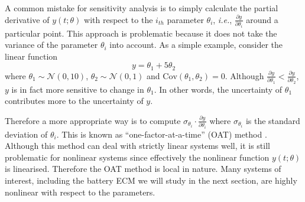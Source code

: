 \documentclass[letterpaper,twocolumn]{IEEEtran}
\begin{document}
A common mistake for sensitivity analysis is to simply calculate the partial derivative of $y(t;\theta)$ with respect to the $i_{th}$ parameter $\theta_i$, \emph{i.e.}, $\frac{\partial y}{\partial \theta_i}$ around a particular point. This approach is problematic because it does not take the variance of the parameter $\theta_i$ into account. As a simple example, consider the linear function
\begin{equation}y = \theta_1+5\theta_2
\end{equation}
where $\theta_1 \sim \mathcal{N}(0,10)$, $\theta_2 \sim \mathcal{N}(0,1)$ and $\mathrm{Cov}(\theta_1,\theta_2)=0$. Although $\frac{\partial y}{\partial \theta_1} < \frac{\partial y}{\partial \theta_2}$, $y$ is in fact more sensitive to change in $\theta_1$. In other words, the uncertainty of $\theta_1$ contributes more to the uncertainty of $y$.

Therefore a more appropriate way is to compute $\sigma_{\theta_i}\cdot\frac{\partial y}{\partial \theta_i}$ where $\sigma_{\theta_i}$ is the standard deviation of $\theta_i$. This is known as ``one-factor-at-a-time'' (OAT) method \cite{saltelli2006sensitivity}. Although this method can deal with strictly linear systems well, it is still problematic for nonlinear systems since effectively the nonlinear function $y(t;\theta)$ is linearised. Therefore the OAT method is local in nature. Many systems of interest, including the battery ECM we will study in the next section, are highly nonlinear with respect to the parameters.
\end{document}
